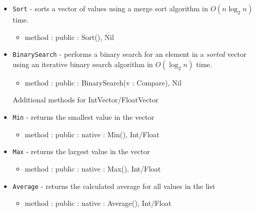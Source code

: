 \documentclass[12pt]{article}
\begin{document}
\begin{itemize}
    \item \texttt{Sort} - sorts a vector of values using a merge sort algorithm in $O(n \log_2 n)$ time.
    	\begin{itemize}
	\item method : public : Sort(), Nil
	\end{itemize}
    \item \texttt{BinarySearch} - performs a binary search for an element in a \emph{sorted} vector using an iterative binary search algorithm in $O(\log_2 n)$ time.
    	\begin{itemize}
	\item method : public : BinarySearch(v : Compare), Nil
	\end{itemize}
Additional methods for IntVector/FloatVector
    \item \texttt{Min} - returns the smallest value in the vector
    	\begin{itemize}
	\item method : public : native : Min(), Int/Float
	\end{itemize}
    \item \texttt{Max} - returns the largest value in the vector
    	\begin{itemize}
	\item method : public : native : Max(), Int/Float
	\end{itemize}
    \item \texttt{Average} - returns the calculated average for all values in the list
    	\begin{itemize}
	\item method : public : native : Average(), Int/Float
	\end{itemize}
\end{itemize}
\end{document}
